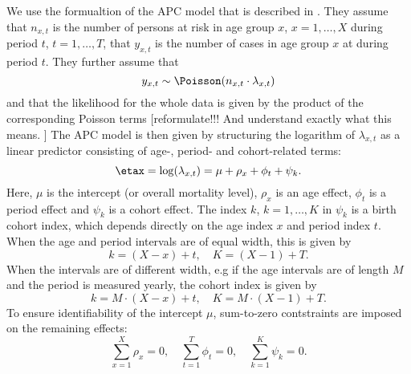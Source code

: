 We use the formualtion of the APC model that is described in \citet{rieblerHeld2010}. 
They assume that $n_{x,t}$ is the number of persons at risk in age group $x$, $x = 1,\ldots,X$ during period $t$, $t = 1,\ldots,T$, that $y_{x,t}$ is the number of cases in age group $x$ at during period $t$. They further assume that 
\begin{equation}
    y_{x,t} \sim \Poisson(n_{x,t}\cdot \lambda_{x,t})
\end{equation}
and that the likelihood for the whole data is given by the product of the corresponding Poisson terms [reformulate!!! And understand exactly what this means. ]
The APC model is then given by structuring the logarithm of $\lambda_{x,t}$ as a linear predictor consisting of age-, period- and cohort-related terms:
\begin{equation}
    \etax = \log(\lambda_{x,t}) = \mu + \rho_x + \phi_t + \psi_k.
    \label{eq:APCmodel}
\end{equation}
Here, $\mu$ is the intercept (or overall mortality level), $\rho_x$ is an age effect, $\phi_t$ is a period effect and $\psi_k$ is a cohort effect. The index $k$, $k = 1,\ldots,K$ in $\psi_k$ is a birth cohort index, which depends directly on the age index $x$ and period index $t$. When the age and period intervals are of equal width, this is given by
\begin{equation*}
    k = (X - x) + t, \quad K = (X - 1) + T.
\end{equation*}
When the intervals are of different width, e.g if the age intervals are of length $M$ and the period is measured yearly, the cohort index is given by
\begin{equation}
    k = M \cdot (X - x) + t, \quad K = M \cdot (X - 1) + T.
    \label{eq:cohortIndex}
\end{equation}
To ensure identifiability of the intercept $\mu$, sum-to-zero contstraints are imposed on the remaining effects:
\begin{equation}
    \sum_{x = 1}^{X}\rho_x = 0, \quad \sum_{t = 1}^T\phi_t = 0, \quad \sum_{k = 1}^K \psi_k = 0. 
    \label{eq:APCconstraints}
\end{equation}